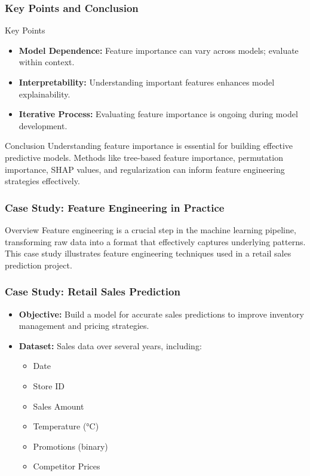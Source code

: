 \documentclass[aspectratio=169]{beamer}
\begin{document}
\begin{frame}
    \frametitle{Key Points and Conclusion}
    \begin{block}{Key Points}
        \begin{itemize}
            \item \textbf{Model Dependence:} Feature importance can vary across models; evaluate within context.
            \item \textbf{Interpretability:} Understanding important features enhances model explainability.
            \item \textbf{Iterative Process:} Evaluating feature importance is ongoing during model development.
        \end{itemize}
    \end{block}

    \begin{block}{Conclusion}
        Understanding feature importance is essential for building effective predictive models. Methods like tree-based feature importance, permutation importance, SHAP values, and regularization can inform feature engineering strategies effectively.
    \end{block}
\end{frame}

\begin{frame}[fragile]
    \frametitle{Case Study: Feature Engineering in Practice}
    \begin{block}{Overview}
        Feature engineering is a crucial step in the machine learning pipeline, transforming raw data into a format that effectively captures underlying patterns. This case study illustrates feature engineering techniques used in a retail sales prediction project.
    \end{block}
\end{frame}

\begin{frame}[fragile]
    \frametitle{Case Study: Retail Sales Prediction}
    \begin{itemize}
        \item \textbf{Objective:} Build a model for accurate sales predictions to improve inventory management and pricing strategies.
        \item \textbf{Dataset:} Sales data over several years, including:
        \begin{itemize}
            \item Date
            \item Store ID
            \item Sales Amount
            \item Temperature (°C)
            \item Promotions (binary)
            \item Competitor Prices
        \end{itemize}
    \end{itemize}
\end{frame}
\end{document}
